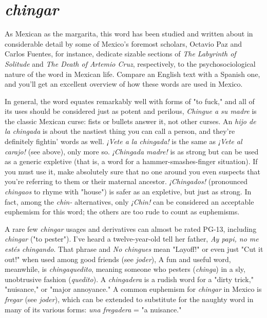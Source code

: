 \section{\emph{chingar}}

As Mexican as the margarita, this word has been studied and
written about in considerable detail by some of Mexico's foremost
scholars, Octavio Paz and Carlos Fuentes, for instance, dedicate sizable
sections of \emph{The Labyrinth of Solitude} and \emph{The Death of Artemio Cruz},
respectively, to the psychosociological nature of the word in Mexican
life. Compare an English text with a Spanish one, and you'll get an excellent overview of how these words are used in Mexico.

In general, the word equates remarkably well with forms of "to
fuck," and all of its uses should be considered just as potent and perilous, \emph{Chingue a su madre} is the classic Mexican curse: fists or bullets
answer it, not other curses. An \emph{hijo de la chingada} is about the nastiest thing you can call a person, and they're definitely fightin' words as
well. \emph{¡Vete a la chingada!} is the same as \emph{¡Vete al carajo!} (see above),
only more so. \emph{¡Chingada madre!} is as strong but can be used as a generic expletive (that is, a word for a hammer-smashes-finger situation).
If you must use it, make absolutely sure that no one around you even
suspects that you're referring to them or their maternal ancestor. \emph{¡Chingados!} (pronounced \emph{chingaos} to rhyme with "house") is safer as an expletive, but just as strong. In fact, among the \emph{chin-} alternatives, only
\emph{¡Chin!} can be considered an acceptable euphemism for this word; the
others are too rude to count as euphemisms.

A rare few \emph{chingar} usages and derivatives can almost be rated
PG-13, including \emph{chingar} ("to pester"). I've heard a twelve-year-old tell
her father, \emph{Ay papi, no me estés chingando}. That phrase and \emph{No chingues} mean "Layoff!" or even just "Cut it out!" when used among good
friends (see \emph{joder}), A fun and useful word, meanwhile, is \emph{chingaquedito}, meaning someone who pesters (\emph{chinga}) in a sly, unobtrusive fashion (\emph{quedito}). A \emph{chingadera} is a rudish word for a "dirty trick," "nuisance," or "major annoyance." A common euphemism for \emph{chingar} in
Mexico is \emph{fregar} (see \emph{joder}), which can be extended to substitute for
the naughty word in many of its various forms: \emph{una fregadera} = "a
nuisance."

